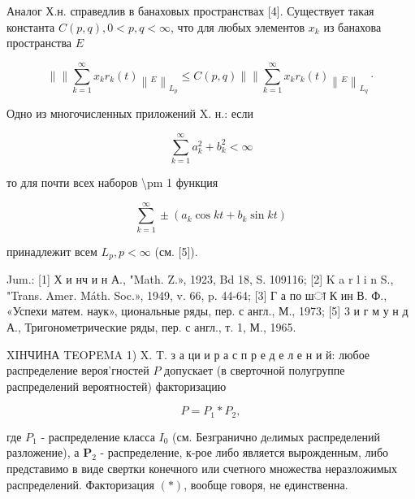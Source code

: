 \documentclass[10pt]{article}
\begin{document}
Аналог Х.н. справедлив в банаховых пространствах [4]. Существует такая константа $C(p, q), 0<p, q<\infty$, что для любых элементов $x_{k}$ из банахова пространства $E$



\[

\|\| \sum_{k=1}^{\infty} x_{k} r_{k}(t)\left\|_{E}\right\|_{L_{p}} \leqslant C(p, q)\|\| \sum_{k=1}^{\infty} x_{k} r_{k}(t)\left\|_{E}\right\|_{L_{q}} \cdot

\]



Одно из многочисленных приложений $\mathrm{X}$. н.: если



\[

\sum_{k=1}^{\infty} a_{k}^{2}+b_{k}^{2}<\infty

\]



то для почти всех наборов \textbackslash pm 1 функция



\[

\sum_{k=1}^{\infty} \pm\left(a_{k} \cos k t+b_{k} \sin k t\right)

\]



принадлежит всем $L_{p}, p<\infty$ (см. [5]).



Jum.: [1] Х и нч и н А., "Math. Z.», 1923, Bd 18, S. 109116; [2] K a r l i n S., "Trans. Amer. Máth. Soc.», 1949, v. 66, p. 44-64; [3] Г а по шा К ин В. Ф., «Успехи матем. наук», циональные ряды, пер. с англ., М., 1973; [5] 3 и г м у н д А., Тригонометрические ряды, пер. с англ., т. 1, М., 1965.



XIHЧИНА TEOPEMA 1) $\mathrm{X}$. T. з а ци и р а с п р е д е л е н и й: любое распределение вероя'гностей $P$ допускает (в сверточной полугруппе распределений вероятностей) факторизацию



\[

P=P_{1} * P_{2},

\]



где $P_{1}$ - распределение класса $I_{0}$ (см. Безгранично дeлимых распределений разложение), а $\boldsymbol{P}_{2}$ - распределение, к-рое либо является вырожденным, либо представимо в виде свертки конечного или счетного множества неразложимых распределений. Факторизация $(*)$, вообще говоря, не единственна.
\end{document}
